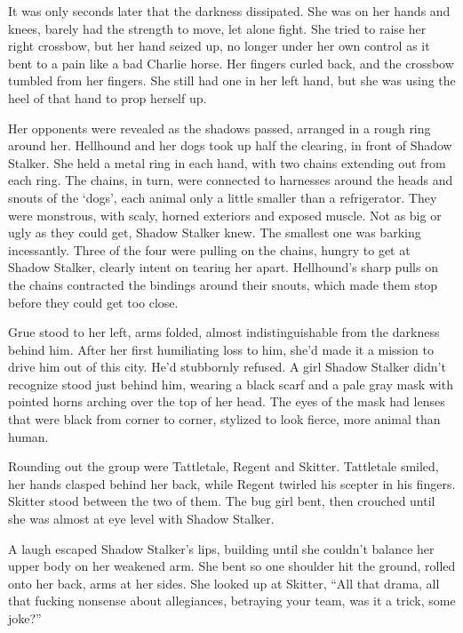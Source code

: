 It was only seconds later that the darkness dissipated.  She was on her hands and knees, barely had the strength to move, let alone fight.  She tried to raise her right crossbow, but her hand seized up, no longer under her own control as it bent to a pain like a bad Charlie horse.  Her fingers curled back, and the crossbow tumbled from her fingers.  She still had one in her left hand, but she was using the heel of that hand to prop herself up.



Her opponents were revealed as the shadows passed, arranged in a rough ring around her.  Hellhound and her dogs took up half the clearing, in front of Shadow Stalker.  She held a metal ring in each hand, with two chains extending out from each ring.   The chains, in turn, were connected to harnesses around the heads and snouts of the `dogs', each animal only a little smaller than a refrigerator.  They were monstrous, with scaly, horned exteriors and exposed muscle.  Not as big or ugly as they could get, Shadow Stalker knew.  The smallest one was barking incessantly.  Three of the four were pulling on the chains, hungry to get at Shadow Stalker, clearly intent on tearing her apart.  Hellhound's sharp pulls on the chains contracted the bindings around their snouts, which made them stop before they could get too close.



Grue stood to her left, arms folded, almost indistinguishable from the darkness behind him.  After her first humiliating loss to him, she'd made it a mission to drive him out of this city.  He'd stubbornly refused.  A girl Shadow Stalker didn't recognize stood just behind him, wearing a black scarf and a pale gray mask with pointed horns arching over the top of her head.  The eyes of the mask had lenses that were black from corner to corner, stylized to look fierce, more animal than human.



Rounding out the group were Tattletale, Regent and Skitter.  Tattletale smiled, her hands clasped behind her back, while Regent twirled his scepter in his fingers.  Skitter stood between the two of them.  The bug girl bent, then crouched until she was almost at eye level with Shadow Stalker.



A laugh escaped Shadow Stalker's lips, building until she couldn't balance her upper body on her weakened arm.  She bent so one shoulder hit the ground, rolled onto her back, arms at her sides.  She looked up at Skitter, ``All that drama, all that fucking nonsense about allegiances, betraying your team, was it a trick, some joke?''



